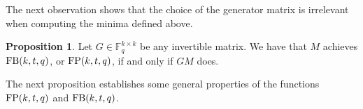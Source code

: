 \documentclass[11pt,a4paper]{article}
\theoremstyle{definition}
\newtheorem{proposition}[theorem]{Proposition}
\newcommand{\F}{\mathbb F}
\newcommand{\Cc}{\mathcal C}
\newcommand{\fb}{\textnormal{FB}}
\newcommand{\fp}{\textnormal{FP}}
\begin{document}
The next observation shows that the choice of the generator matrix is irrelevant when computing the minima defined above.

\begin{proposition}
\label{prop:invertibleG}
Let $G \in \F_q^{k\times k}$ be any invertible matrix. We have that $M$ achieves $\fb(k,t,q)$, or $\fp(k,t,q)$, if and only if $GM$ does.
\end{proposition}

The next proposition establishes some general properties of the 
functions $\fp(k,t,q)$ and $\fb(k,t,q)$.
\end{document}
